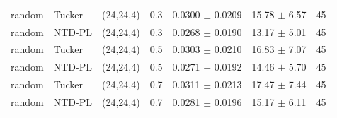 \begin{tabular}{@{}l l c c c c c@{}}
random & Tucker & (24,24,4) & 0.3 & 0.0300 $\pm$ 0.0209 & 15.78 $\pm$ 6.57 & 45\\
random & NTD-PL & (24,24,4) & 0.3 & 0.0268 $\pm$ 0.0190 & 13.17 $\pm$ 5.01 & 45\\
random & Tucker & (24,24,4) & 0.5 & 0.0303 $\pm$ 0.0210 & 16.83 $\pm$ 7.07 & 45\\
random & NTD-PL & (24,24,4) & 0.5 & 0.0271 $\pm$ 0.0192 & 14.46 $\pm$ 5.70 & 45\\
random & Tucker & (24,24,4) & 0.7 & 0.0311 $\pm$ 0.0213 & 17.47 $\pm$ 7.44 & 45\\
random & NTD-PL & (24,24,4) & 0.7 & 0.0281 $\pm$ 0.0196 & 15.17 $\pm$ 6.11 & 45\\
\bottomrule
\end{tabular}
